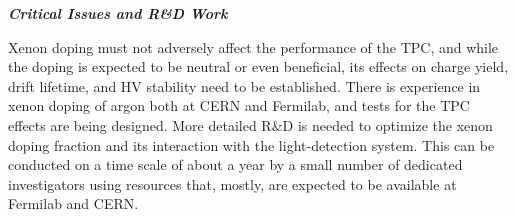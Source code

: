 

{\it\bf Critical Issues and R\&D Work}

Xenon doping must not adversely affect the performance of the TPC, and while the doping is expected to be neutral or even beneficial, its effects on charge yield, drift lifetime, and HV stability need to be established.  There is experience in xenon doping of argon both at CERN and Fermilab, and tests for the TPC effects are being designed.  
More detailed R\&D is needed to optimize the xenon doping fraction and its interaction with the light-detection system. This can be conducted on a time scale of about a year by a small number of dedicated investigators using resources that, mostly, are expected to be available at Fermilab and CERN. 

